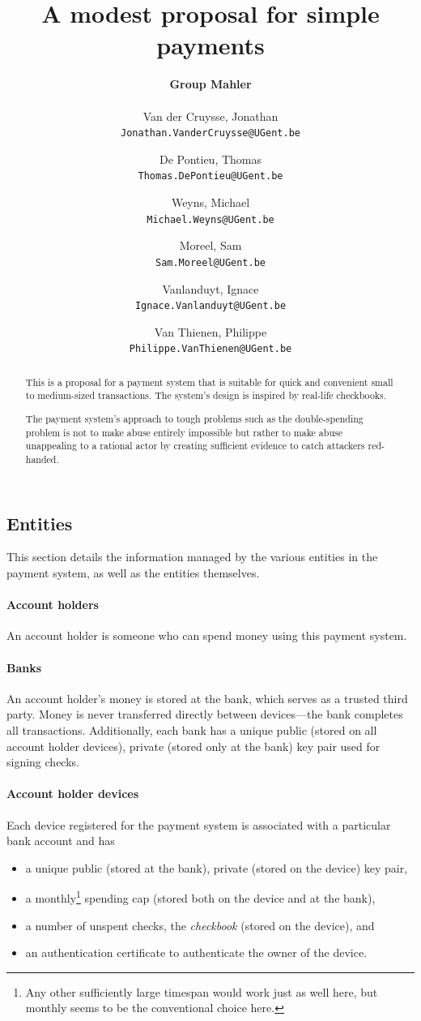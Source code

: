 \documentclass[12pt,a4paper]{article}
\author{
\textbf{Group Mahler}\\~\\
  Van der Cruysse, Jonathan\\ \texttt{Jonathan.VanderCruysse@UGent.be}
  \and
  De Pontieu, Thomas\\ \texttt{Thomas.DePontieu@UGent.be}
  \and
 Weyns, Michael\\ \texttt{Michael.Weyns@UGent.be}
\and
Moreel, Sam\\ \texttt{Sam.Moreel@UGent.be}
\and
Vanlanduyt, Ignace\\ \texttt{Ignace.Vanlanduyt@UGent.be}
\and
Van Thienen, Philippe\\ \texttt{Philippe.VanThienen@UGent.be}
}
\title{A modest proposal for simple payments}
\begin{document}
	\maketitle
	
	\begin{abstract}
		This is a proposal for a payment system that is suitable for quick and convenient small to medium-sized transactions. The system's design is inspired by real-life checkbooks.
		
		The payment system's approach to tough problems such as the double-spending problem is not to make abuse entirely impossible but rather to make abuse unappealing to a rational actor by creating sufficient evidence to catch attackers red-handed.
	\end{abstract}

	\begin{multicols}{2}

	\section{Entities}
	\label{sec:entities}
	
	This section details the information managed by the various entities in the payment system, as well as the entities themselves.
	
	\paragraph{Account holders} An account holder is someone who can spend money using this payment system.
	
	\paragraph{Banks}
	
	An account holder's money is stored at the bank, which serves as a trusted third party. Money is never transferred directly between devices---the bank completes all transactions. Additionally, each bank has a unique public (stored on all account holder devices), private (stored only at the bank) key pair used for signing checks.
	
	\paragraph{Account holder devices}
	
	Each device registered for the payment system is associated with a particular bank account and has
	\begin{itemize}
		\item a unique public (stored at the bank), private (stored on the device) key pair,
		\item a monthly\footnote{Any other sufficiently large timespan would work just as well here, but monthly seems to be the conventional choice here.} spending cap (stored both on the device and at the bank),
		\item a number of unspent checks, the \emph{checkbook} (stored on the device), and
		\item an authentication certificate to authenticate the owner of the device.
	\end{itemize}


\end{multicols}
\end{document}
